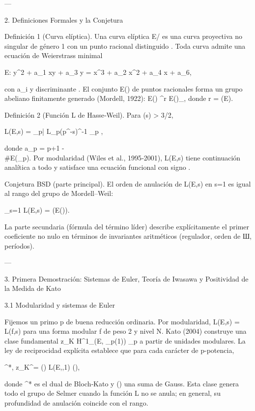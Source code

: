\documentclass[12pt,twoside]{book}
\begin{document}
---

2. Definiciones Formales y la Conjetura

Definición 1 (Curva elíptica). Una curva elíptica E/ es una curva proyectiva no singular de género 1 con un punto racional distinguido . Toda curva admite una ecuación de Weierstrass minimal

E: y^2 + a_1 xy + a_3 y = x^3 + a_2 x^2 + a_4 x + a_6,

con a_i \in {} y discriminante \Delta {}. El conjunto E() de puntos racionales forma un grupo abeliano finitamente generado (Mordell, 1922): E() \cong {}^r \times E()_{}, donde r = (E).

Definición 2 (Función L de Hasse‑Weil). Para \Re(s) > 3/2,

L(E,s) = \prod_{p|\Delta} L_p(p^{-s})^{-1} \prod_{p \nmid \Delta} ,

donde a_p = p+1 - \\#E(_p). Por modularidad (Wiles et al., 1995‑2001), L(E,s) tiene continuación analítica a todo  y satisface una ecuación funcional con signo .

Conjetura BSD (parte principal). El orden de anulación de L(E,s) en s=1 es igual al rango del grupo de Mordell–Weil:

_{s=1} L(E,s) = (E()).

La parte secundaria (fórmula del término líder) describe explícitamente el primer coeficiente no nulo en términos de invariantes aritméticos (regulador, orden de Ш, períodos).

---

3. Primera Demostración: Sistemas de Euler, Teoría de Iwasawa y Positividad de la Medida de Kato

3.1 Modularidad y sistemas de Euler

Fijemos un primo p de buena reducción ordinaria. Por modularidad, L(E,s) = L(f,s) para una forma modular f de peso 2 y nivel N. Kato (2004) construye una clase fundamental z_K \in H^1_{}(E, _p(1)) \otimes {}_p a partir de unidades modulares. La ley de reciprocidad explícita establece que para cada carácter \chi de p-potencia,

\langle \exp^*, z_K^\chi \rangle = \tau(\chi) \cdot L(E,\chi,1) \cdot (),

donde \exp^* es el dual de Bloch‑Kato y \tau(\chi) una suma de Gauss. Esta clase genera todo el grupo de Selmer cuando la función L no se anula; en general, su profundidad de anulación coincide con el rango.
\end{document}
